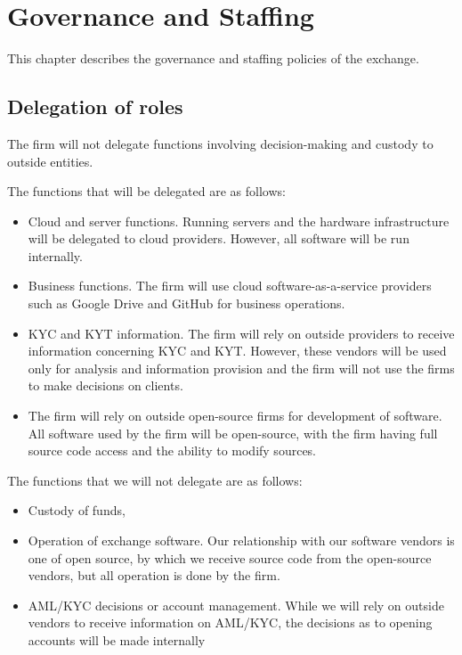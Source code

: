 \chapter{Governance and Staffing}

This chapter describes the governance and staffing policies of the
exchange.

\section{Delegation of roles}

The firm will not delegate functions involving decision-making and
custody to outside entities.

The functions that will be delegated are as follows:
\begin{itemize}
  \item Cloud and server functions.  Running servers and the hardware
    infrastructure will be delegated to cloud providers.  However, all
    software will be run internally.
 \item Business functions.  The firm will use cloud software-as-a-service providers such
   as Google Drive and GitHub for business operations.
 \item KYC and KYT information.  The firm will rely on outside
   providers to receive information concerning KYC and KYT.  However,
   these vendors will be used only for analysis and information
   provision and the firm will not use the firms to make decisions on
   clients.
\item The firm will rely on outside open-source firms for development
  of software.  All software used by the firm will be open-source, with
  the firm having full source code access and the ability to modify sources.
\end{itemize}

The functions that we will not delegate are as follows:
\begin{itemize}
\item Custody of funds,
  \item Operation of exchange software.  Our relationship with our
    software vendors is one of open source, by which we receive source
    code from the open-source vendors, but all operation is done by
    the firm.
 \item AML/KYC decisions or account management.  While we will rely on
   outside vendors to receive information on AML/KYC, the decisions as
   to opening accounts will be made internally
\end{itemize}


